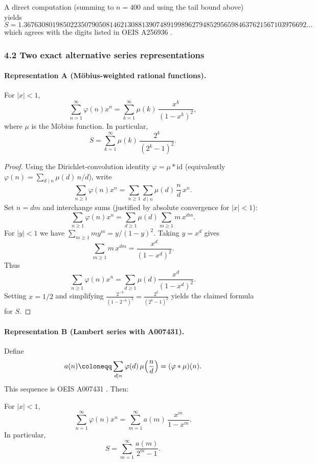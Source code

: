 A direct computation (summing to $n=400$ and using the tail bound above) yields
\[
S = 1.3676308019850223507905081462130881390748919989627948529565984637621567103976692\ldots
\]
which agrees with the digits listed in OEIS A256936 \cite{OEISA256936}.

\subsubsection*{4.2 Two exact alternative series representations}
\paragraph{Representation A (M\"obius-weighted rational functions).}

\begin{proposition}
For $|x|<1$,
\[
\sum_{n=1}^{\infty} \varphi(n) x^n = \sum_{k=1}^{\infty} \mu(k)\,\frac{x^k}{(1-x^k)^2},
\]
where $\mu$ is the M\"obius function. In particular,
\[
S = \sum_{k=1}^{\infty} \mu(k)\,\frac{2^{k}}{(2^{k}-1)^2}.
\]
\end{proposition}

\begin{proof}
Using the Dirichlet-convolution identity $\varphi = \mu * \mathrm{id}$ (equivalently $\varphi(n)=\sum_{d\mid n}\mu(d)\,n/d$), write
\[
\sum_{n\ge 1}\varphi(n)x^n
=\sum_{n\ge 1}\sum_{d\mid n}\mu(d)\,\frac{n}{d}\,x^n.
\]
Set $n=dm$ and interchange sums (justified by absolute convergence for $|x|<1$):
\[
\sum_{n\ge 1}\varphi(n)x^n
=\sum_{d\ge 1}\mu(d)\sum_{m\ge 1} m\,x^{dm}.
\]
For $|y|<1$ we have $\sum_{m\ge 1} m y^m = y/(1-y)^2$. Taking $y=x^d$ gives
\[
\sum_{m\ge 1} m\,x^{dm} = \frac{x^d}{(1-x^d)^2}.
\]
Thus
\[
\sum_{n\ge 1}\varphi(n)x^n = \sum_{d\ge 1}\mu(d)\frac{x^d}{(1-x^d)^2}.
\]
Setting $x=1/2$ and simplifying $\frac{2^{-k}}{(1-2^{-k})^2}=\frac{2^{k}}{(2^{k}-1)^2}$ yields the claimed formula for $S$.
\end{proof}

\paragraph{Representation B (Lambert series with A007431).}
Define
\[
a(n)\coloneqq \sum_{d\mid n} \varphi(d)\,\mu\Bigl(\frac{n}{d}\Bigr)=(\varphi*\mu)(n).
\]
This sequence is OEIS A007431 \cite{OEISA256936,OEISA007431}. Then:

\begin{proposition}
For $|x|<1$,
\[
\sum_{n=1}^{\infty} \varphi(n) x^n 
= \sum_{m=1}^{\infty} a(m)\,\frac{x^m}{1-x^m}.
\]
In particular,
\[
S = \sum_{m=1}^{\infty} \frac{a(m)}{2^m-1}.
\]
\end{proposition}


